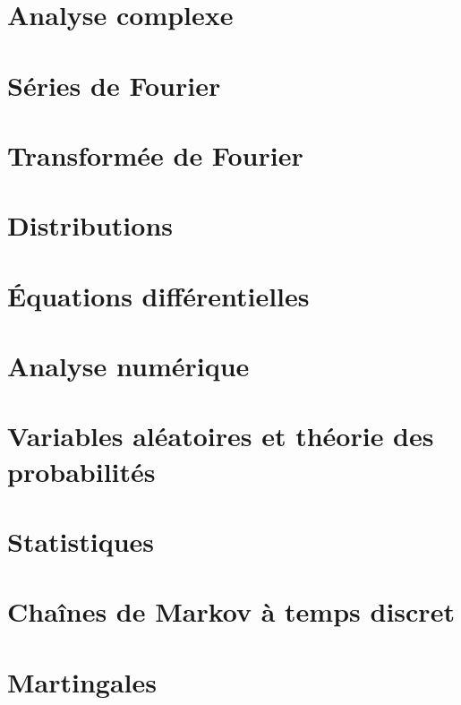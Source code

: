 \chapter{Analyse complexe}



\chapter{Séries de Fourier}


\chapter{Transformée de Fourier}


\chapter{Distributions}


\chapter{Équations différentielles}



\chapter{Analyse numérique}


\chapter{Variables aléatoires et théorie des probabilités}




\chapter{Statistiques}


\chapter{Chaînes de Markov à temps discret}


\chapter{Martingales}


